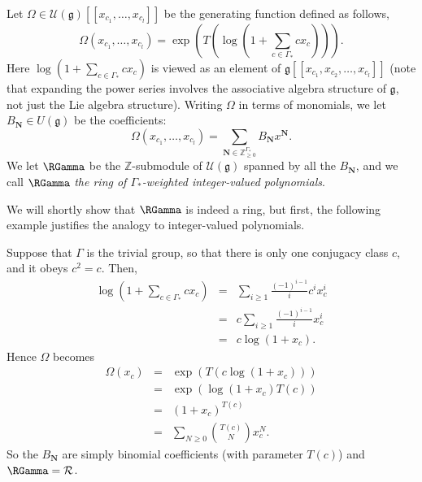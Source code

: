 \begin{definition} \label{rgamma_constr_defn}
Let $\Omega \in \mathcal{U}(\mathfrak{g})[[x_{c_1}, \ldots, x_{c_l}]]$ be the generating function defined as follows,
\[
\Omega(x_{c_1}, \ldots, x_{c_l}) = \exp\left(T\left(\log\left(1 + \sum_{c \in \Gamma_*} c x_c\right)\right)\right).
\]
Here $\log\left(1 + \sum_{c \in \Gamma_*} c x_c\right)$ is viewed as an element of $\mathfrak{g}[[x_{c_1}, x_{c_2}, \ldots, x_{c_l}]]$ \textup{(}note that expanding the power series involves the associative algebra structure of $\mathfrak{g}$, not just the Lie algebra structure\textup{)}. Writing $\Omega$ in terms of monomials, we let $B_{\mathbf{N}} \in U(\mathfrak{g})$ be the coefficients:
\[
\Omega(x_{c_1}, \ldots, x_{c_l}) = \sum_{\mathbf{N} \in \mathbb{Z}_{\geq 0}^{\Gamma_*}} B_{\mathbf{N}} x^{\mathbf{N}}.
\]
We let $\RGamma$ be the $\mathbb{Z}$-submodule of $\mathcal{U}(\mathfrak{g})$ spanned by all the $B_{\mathbf{N}}$, and we call $\RGamma$ \emph{the ring of $\Gamma_*$-weighted integer-valued polynomials}.
\end{definition}

We will shortly show that $\RGamma$ is indeed a ring, but first, the following example justifies the analogy to integer-valued polynomials.
\begin{example} \label{trivial_rg_example}
Suppose that $\Gamma$ is the trivial group, so that there is only one conjugacy class $c$, and it obeys $c^2 = c$. Then,
\begin{eqnarray*}
\log\left(1 + \sum_{c \in \Gamma_*} c x_c\right) &=& 
\sum_{i\geq 1} \frac{(-1)^{i-1}}{i} c^i x_c^i \\
&=& c \sum_{i\geq 1} \frac{(-1)^{i-1}}{i} x_c^i \\
&=& c \log(1+x_c).
\end{eqnarray*}
Hence $\Omega$ becomes
\begin{eqnarray*}
\Omega(x_{c}) &=& \exp(T(c \log(1+x_c))) \\
&=& \exp(\log(1+x_c) T(c)) \\
&=& (1+x_c)^{T(c)} \\
&=& \sum_{N \geq 0} \binom{T(c)}{N} x_c^N.
\end{eqnarray*}
So the $B_{\mathbf{N}}$ are simply binomial coefficients (with parameter $T(c)$) and $\RGamma = \mathcal{R}$.
\end{example}

